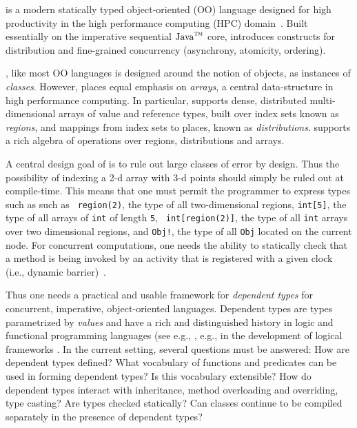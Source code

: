 
%

%
%
%

\Xten{} is a modern statically typed object-oriented (OO) language
designed for high productivity in the high performance computing (HPC)
domain~\cite{X10}. Built essentially on the imperative sequential
$\mbox{Java}^{\mbox{\scriptsize\sc tm}}$ core, \Xten{} introduces constructs for
distribution and fine-grained concurrency (asynchrony, atomicity,
ordering).

\Xten{}, like most OO languages is designed around
the notion of objects, as instances of {\em classes}. However, \Xten{}
places equal emphasis on {\em arrays}, a central data-structure in
high performance computing. In particular, \Xten{} supports dense,
distributed multi-dimensional arrays of value and reference types,
built over index sets known as {\em regions}, and mappings from index
sets to places, known as {\em distributions}.  \Xten{} supports a rich
algebra of operations over regions, distributions and arrays.

A central design goal of \Xten{} is to rule out large classes of error
by design. Thus the possibility of indexing a 2-d array with 3-d
points should simply be ruled out at compile-time. This means that one
must permit the programmer to express types such as such as {\tt
region(2)}, the type of all two-dimensional regions, {\tt int[5]}, the
type of all arrays of {\tt int} of length {\tt 5}, {\tt
int[region(2)]}, the type of all {\tt int} arrays over two dimensional
regions, and {\tt Obj!}, the type of all {\tt Obj} located on the
current node. For concurrent computations, one needs the ability to
statically check that a method is being invoked by an activity that is
registered with a given clock (i.e., dynamic barrier)~\cite{X10}.

Thus one needs a practical and usable framework for {\em dependent
types} for concurrent, imperative, object-oriented
languages. Dependent types are types parametrized by {\em values}
\cite{dependent-types}  and have a rich and distinguished history in
logic and functional programming languages (see e.g.,
\cite{xi99dependent,ocrz-ecoop03,aspinall-attapl,cayenne,epigram-matter}, 
e.g., in the development of logical frameworks
\cite{calc-constructions}.  In the current setting, several questions
must be answered: How are dependent types defined? What vocabulary of
functions and predicates can be used in forming dependent types? Is
this vocabulary extensible?  How do dependent types interact with
inheritance, method overloading and overriding, type casting? Are
types checked statically? Can classes continue to be compiled separately in the presence of dependent types?

